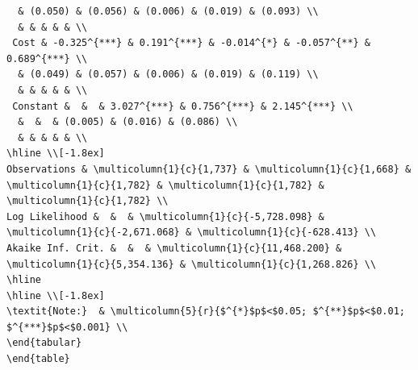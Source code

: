 \documentclass[
  number,
  preprint,
  3p,
  onecolumn]{elsarticle}
\begin{document}
\begin{table}
{\begin{verbatim}
  & (0.050) & (0.056) & (0.006) & (0.019) & (0.093) \\ 
  & & & & & \\ 
 Cost & -0.325^{***} & 0.191^{***} & -0.014^{*} & -0.057^{**} & 0.689^{***} \\ 
  & (0.049) & (0.057) & (0.006) & (0.019) & (0.119) \\ 
  & & & & & \\ 
 Constant &  &  & 3.027^{***} & 0.756^{***} & 2.145^{***} \\ 
  &  &  & (0.005) & (0.016) & (0.086) \\ 
  & & & & & \\ 
\hline \\[-1.8ex] 
Observations & \multicolumn{1}{c}{1,737} & \multicolumn{1}{c}{1,668} & \multicolumn{1}{c}{1,782} & \multicolumn{1}{c}{1,782} & \multicolumn{1}{c}{1,782} \\ 
Log Likelihood &  &  & \multicolumn{1}{c}{-5,728.098} & \multicolumn{1}{c}{-2,671.068} & \multicolumn{1}{c}{-628.413} \\ 
Akaike Inf. Crit. &  &  & \multicolumn{1}{c}{11,468.200} & \multicolumn{1}{c}{5,354.136} & \multicolumn{1}{c}{1,268.826} \\ 
\hline 
\hline \\[-1.8ex] 
\textit{Note:}  & \multicolumn{5}{r}{$^{*}$p$<$0.05; $^{**}$p$<$0.01; $^{***}$p$<$0.001} \\ 
\end{tabular} 
\end{table} 
\end{verbatim}

}

\end{table}%
\end{document}
